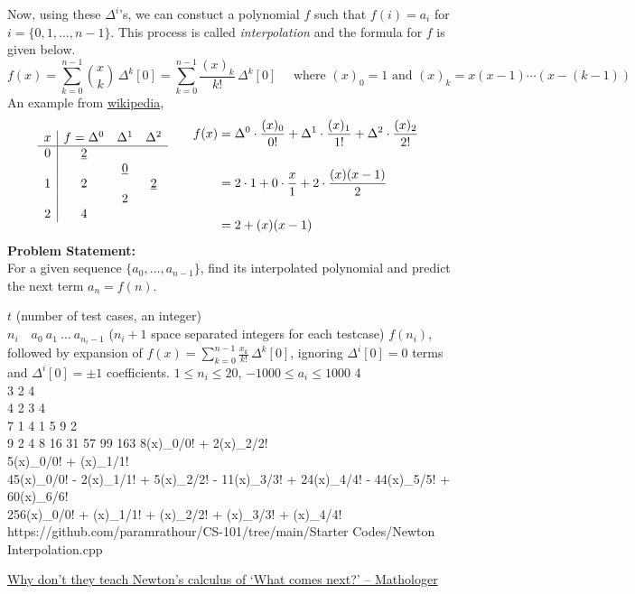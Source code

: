 \documentclass[../../Problems]{subfiles}
\begin{document}
Now, using these $\Delta ^{i}$'s, we can constuct a polynomial $f$ such that $f(i)=a_i$ for $i=\{0,1,\ldots,n-1\}$. This process is called \emph{interpolation} and the formula for $f$ is given below.
\begin{equation}
	f(x)=\sum _{k=0}^{n-1}{\binom {x}{k}}\,\Delta ^{k}[0]=\sum _{k=0}^{n-1}\frac{(x)_k}{k!}\,\Delta ^{k}[0]%
	\quad\text{ where $(x)_0 = 1$ and $(x)_k=x(x-1)\cdots(x-(k-1))$}
\end{equation}
An example from \href{https://en.wikipedia.org/wiki/Finite_difference#Newton's_series}{wikipedia},
\vspace{-1em}\begin{equation}
	{{
	\begin{matrix}{
	\begin{array}{c|ccc} x&f=\Delta ^{0}&\Delta ^{1}&\Delta ^{2}\\\hline 0&{\underline {2}}&&\\
	&&{\underline {0}}&\\
	1&2&&{\underline {2}}\\
	&&2&\\
	2&4&&
	\end{array}}
	&\quad {
	\begin{aligned}
	f(x)&=\Delta ^{0}\cdot {\dfrac {(x)_{0}}{0!}}+\Delta ^{1}\cdot {\dfrac {(x)_{1}}{1!}}+\Delta ^{2}\cdot {\dfrac {(x)_{2}}{2!}}\quad\\\\
	&=2\cdot 1+0\cdot {\dfrac {x}{1}}+2\cdot {\dfrac {(x)(x-1)}{2}}\\\\
	&=2+(x)(x-1)
	\end{aligned}}\end{matrix}}}\vspace{-0.5em}
\end{equation}
\textbf{Problem Statement:}\\
For a given sequence $\{a_0,\ldots,a_{n-1}\}$, find its interpolated polynomial and predict the next term $a_{n}=f(n)$.
\begin{testcases}
	{$t$ \hfill(number of test cases, an integer)\\$n_i\quad a_{0}\ a_1\ \ldots\ a_{n_i-1}$ \hfill($n_i+1$ space separated integers for each testcase)}
	{$f(n_i)$, followed by expansion of $f(x)=\displaystyle\sum _{k=0}^{n-1}\frac{x_k}{k!}\,\Delta ^{k}[0]$, ignoring $\Delta ^{i}[0]=0$ terms and $\Delta ^{i}[0]=\pm1$ coefficients.}
	{$1 \leq n_i \leq 20$, $-1000 \leq a_i \leq 1000$}
	{4\\3 2 4\\4 2 3 4\\7 1 4 1 5 9 2\\9 2 4 8 16 31 57 99 163}
	{8(x)\_{0}/0! + 2(x)\_{2}/2!\\5\quad(x)\_{0}/0! + (x)\_{1}/1!\\45(x)\_{0}/0! - 2(x)\_{1}/1! + 5(x)\_{2}/2! - 11(x)\_{3}/3! + 24(x)\_{4}/4! - 44(x)\_{5}/5! + 60(x)\_{6}/6!\\256\quad(x)\_{0}/0! + (x)\_{1}/1! + (x)\_{2}/2! + (x)\_{3}/3! + (x)\_{4}/4!}
	{https://github.com/paramrathour/CS-101/tree/main/Starter Codes/Newton Interpolation.cpp}
\end{testcases}
\begin{funvideo}
	\href{https://youtu.be/4AuV93LOPcE}{Why don't they teach Newton's calculus of `What comes next?' -- Mathologer}
\end{funvideo}
\end{document}
